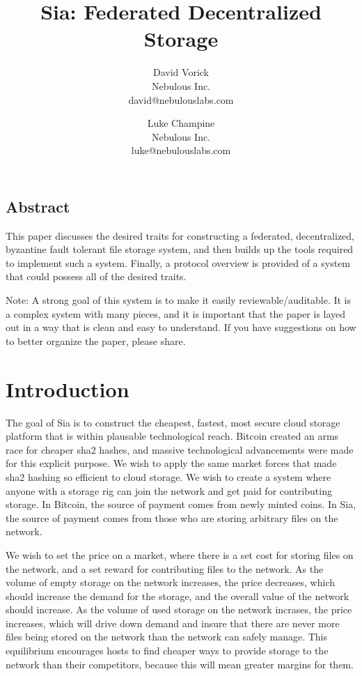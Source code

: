 \documentclass[twocolumn]{article}
\begin{document}
\frenchspacing

\title{Sia: Federated Decentralized Storage}

\author{
{\rm David Vorick}\\
Nebulous Inc.\\
david@nebulouslabs.com
\and
{\rm Luke Champine}\\
Nebulous Inc. \\
luke@nebulouslabs.com
}

\maketitle

\subsection*{Abstract}
This paper discusses the desired traits for constructing a federated, decentralized, byzantine fault tolerant file storage system, and then builds up the tools required to implement such a system. Finally, a protocol overview is provided of a system that could possess all of the desired traits.

Note: A strong goal of this system is to make it easily reviewable/auditable.
It is a complex system with many pieces, and it is important that the paper is layed out in a way that is clean and easy to understand.
If you have suggestions on how to better organize the paper, please share.

\section{Introduction}
The goal of Sia is to construct the cheapest, fastest, most secure cloud storage platform that is within plausable technological reach.
Bitcoin created an arms race for cheaper sha2 hashes, and massive technological advancements were made for this explicit purpose.
We wish to apply the same market forces that made sha2 hashing so efficient to cloud storage.
We wish to create a system where anyone with a storage rig can join the network and get paid for contributing storage.
In Bitcoin, the source of payment comes from newly minted coins.
In Sia, the source of payment comes from those who are storing arbitrary files on the network.

We wish to set the price on a market, where there is a set cost for storing files on the network, and a set reward for contributing files to the network.
As the volume of empty storage on the network increases, the price decreases, which should increase the demand for the storage, and the overall value of the network should increase.
As the volume of used storage on the network incrases, the price increases, which will drive down demand and insure that there are never more files being stored on the network than the network can safely manage.
This equilibrium encourages hosts to find cheaper ways to provide storage to the network than their competitors, because this will mean greater margins for them.
\end{document}
